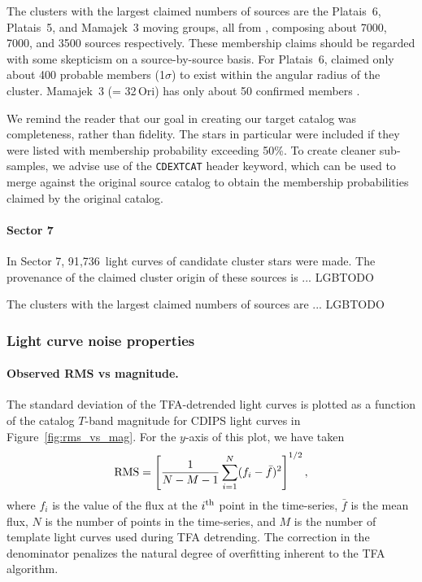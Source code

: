 \documentclass[12pt,twocolumn,tighten]{aastex62}
\newcommand{\sVIInumberlcs}{91{,}736\ }  %
\begin{document}
The clusters with the largest claimed numbers of sources are the
Platais~6, Platais~5, and Mamajek~3 moving groups, all from
\citet{dias_proper_2014}, composing about 7000, 7000, and 3500 sources
respectively. These membership claims should be regarded with some
skepticism on a source-by-source basis.  For Platais~6,
\citet{Kharchenko_et_al_2013} claimed only about 400 probable members
(1$\sigma$) to exist within the angular radius of the cluster.
Mamajek~3 (= 32$\,$Ori) has only about 50 confirmed members
\citep{bell_32ori_2017}.

We remind the reader that our goal in creating our target catalog was
completeness, rather than fidelity. The \citet{dias_proper_2014} stars
in particular were included if they were listed with membership
probability exceeding 50\%.  To create cleaner sub-samples, we advise
use of the \texttt{CDEXTCAT} header keyword, which can be used
to merge against the original source catalog to obtain the
membership probabilities claimed by the original catalog.

\paragraph{Sector 7}
In Sector 7, \sVIInumberlcs light curves of candidate cluster stars
were made. The provenance of the claimed cluster origin of these
sources is  ... LGBTODO

The clusters with the largest claimed numbers of sources are ...
LGBTODO

\subsubsection{Light curve noise properties}
\label{subsubsec:rmsvsmag}

\paragraph{Observed RMS vs magnitude.}
The standard deviation of the TFA-detrended light curves is plotted as
a function of the catalog $T$-band magnitude for CDIPS light curves in
Figure~\ref{fig:rms_vs_mag}.
For the $y$-axis of this plot, we have taken
\begin{equation}
  {\rm RMS} = \left[
    \frac{1}{N-M-1}
    \sum_{i=1}^{N} (f_i - \bar{f})^2
  \right]^{1/2},
\end{equation}
where $f_i$ is the value of the flux at the $i^{\rm th}$ point in the
time-series, $\bar{f}$ is the mean flux, $N$ is the
number of points in the time-series, and $M$ is the number
of template light curves used during TFA detrending.
The correction in the denominator penalizes the natural degree of
overfitting inherent to the TFA algorithm.
\end{document}

